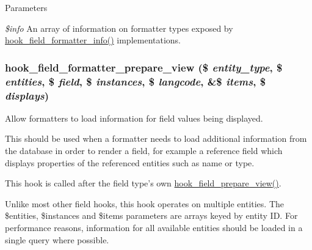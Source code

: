 \begin{DoxyParams}{Parameters}
\item[{\em \$info}]An array of information on formatter types exposed by \hyperlink{group__field__formatter_ga2f5aa1c7455f55dffd84a48efa57f987}{hook\_\-field\_\-formatter\_\-info()} implementations. \end{DoxyParams}
\hypertarget{group__field__formatter_ga2c1856869caa776fd9e5db4af4e0b57b}{
\subsubsection[{hook\_\-field\_\-formatter\_\-prepare\_\-view}]{\setlength{\rightskip}{0pt plus 5cm}hook\_\-field\_\-formatter\_\-prepare\_\-view (\$ {\em entity\_\-type}, \/  \$ {\em entities}, \/  \$ {\em field}, \/  \$ {\em instances}, \/  \$ {\em langcode}, \/  \&\$ {\em items}, \/  \$ {\em displays})}}
\label{group__field__formatter_ga2c1856869caa776fd9e5db4af4e0b57b}
Allow formatters to load information for field values being displayed.

This should be used when a formatter needs to load additional information from the database in order to render a field, for example a reference field which displays properties of the referenced entities such as name or type.

This hook is called after the field type's own \hyperlink{group__field__types_ga02a3004a67ecba2b81eaa63b05d08cc8}{hook\_\-field\_\-prepare\_\-view()}.

Unlike most other field hooks, this hook operates on multiple entities. The \$entities, \$instances and \$items parameters are arrays keyed by entity ID. For performance reasons, information for all available entities should be loaded in a single query where possible.


